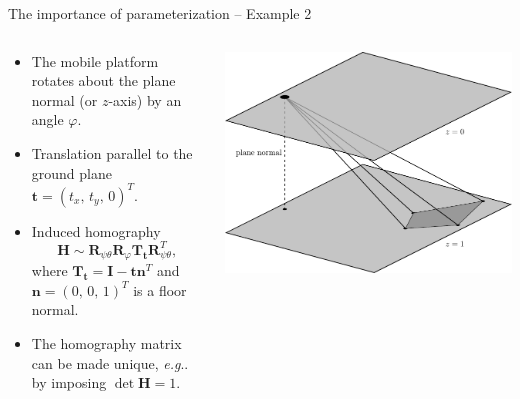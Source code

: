 \documentclass[aspectratio=169]{beamer}
\makeatletter
\renewcommand{\phi}{\varphi}
\newcommand{\mat}[1]{\bm{#1}}
\newcommand{\T}{T}
\DeclareRobustCommand\eg{\emph{e.g}\@ifnextchar.{}{.\@}}
\makeatother
\begin{document}
\begin{frame}[t]{The importance of parameterization -- Example 2}
\begin{columns}
    \begin{column}{0.5\textwidth}
        \begin{minipage}[t][\textheight][t]{\textwidth}
        \theimportanceTwoHeight
        \begin{itemize}
        \item The mobile platform rotates about the
        plane normal (or $z$-axis) by an angle $\phi$.
        \item Translation parallel to the ground plane~$\mat{t}=(t_x,\,t_y,\,0)^{\T}$.
        \item Induced homography
        \begin{equation*}\label{eq:Hplanar}
            \mat{H} \sim \mat{R}_{\psi\theta}\mat{R}_{\phi}\mat{T}_{\mat{t}}\mat{R}_{\psi\theta}^{\T},
        \end{equation*}
        where $\mat{T}_{\mat{t}}=\mat{I}-\mat{tn}^{\T}$ and
        $\mat{n}=(0,\,0,\,1)^{\T}$ is a floor normal.
        \item The homography matrix can be made unique, \eg{} by imposing $\det{\mat{H}}=1$.
        \end{itemize}
        \end{minipage}
    \end{column}%
    \begin{column}{0.5\textwidth}
        \centering
        \includegraphics[width=\linewidth]{../lecture_notes/images/prob_geom1.pdf}
    \end{column}
\end{columns}
\end{frame}
\end{document}

